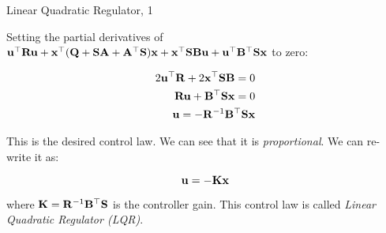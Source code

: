 \documentclass{beamer}
\begin{document}
\begin{frame}{Linear Quadratic Regulator, 1}
\begin{flushleft}


Setting the partial derivatives of $\mathbf{u}^\top \mathbf{R} \mathbf{u}
+ 
\mathbf{x}^\top (
\mathbf{Q} + \mathbf{S} \mathbf{A} + \mathbf{A}^\top \mathbf{S}
)\mathbf{x}
+ 
\mathbf{x}^\top \mathbf{S} \mathbf{B} \mathbf{u} 
+ \mathbf{u}^\top \mathbf{B}^\top \mathbf{S} \mathbf{x}$ to zero:


\begin{align}
2 \mathbf{u} ^\top \mathbf{R} + 
2 \mathbf{x}^\top \mathbf{S} \mathbf{B} = 0
\\
\mathbf{R} \mathbf{u} + 
 \mathbf{B}^\top   \mathbf{S} \mathbf{x}= 0
 \\
 \mathbf{u} = 
 -\mathbf{R}^{-1} \mathbf{B}^\top \mathbf{S} \mathbf{x}
\end{align}

This is the desired control law. We can see that it is \emph{proportional}. We can re-write it as:

\begin{equation}
\mathbf{u} = -\mathbf{K} \mathbf{x}
\end{equation}

where $\mathbf{K}  = \mathbf{R}^{-1} \mathbf{B}^\top \mathbf{S}$ is the controller gain. This control law is called \emph{Linear Quadratic Regulator (LQR)}.

\end{flushleft}
\end{frame}
\end{document}

